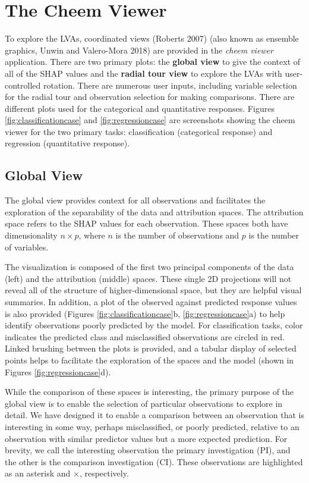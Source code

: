 \documentclass[
]{article}
\begin{document}
\hypertarget{sec:cheemviewer}{%
\section{The Cheem Viewer}\label{sec:cheemviewer}}

To explore the LVAs, coordinated views (Roberts 2007) (also known as ensemble graphics, Unwin and Valero-Mora 2018) are provided in the \emph{cheem viewer} application. There are two primary plots: the \textbf{global view} to give the context of all of the SHAP values and the \textbf{radial tour view} to explore the LVAs with user-controlled rotation. There are numerous user inputs, including variable selection for the radial tour and observation selection for making comparisons. There are different plots used for the categorical and quantitative responses. Figures \ref{fig:classificationcase} and \ref{fig:regressioncase} are screenshots showing the cheem viewer for the two primary tasks: classification (categorical response) and regression (quantitative response).

\hypertarget{global-view}{%
\subsection{Global View}\label{global-view}}

The global view provides context for all observations and facilitates the exploration of the separability of the data and attribution spaces. The attribution space refers to the SHAP values for each observation. These spaces both have dimensionality \(n \times p\), where \(n\) is the number of observations and \(p\) is the number of variables.

The visualization is composed of the first two principal components of the data (left) and the attribution (middle) spaces. These single 2D projections will not reveal all of the structure of higher-dimensional space, but they are helpful visual summaries. In addition, a plot of the observed against predicted response values is also provided (Figures \ref{fig:classificationcase}b, \ref{fig:regressioncase}a) to help identify observations poorly predicted by the model. For classification tasks, color indicates the predicted class and misclassified observations are circled in red. Linked brushing between the plots is provided, and a tabular display of selected points helps to facilitate the exploration of the spaces and the model (shown in Figures \ref{fig:regressioncase}d).

While the comparison of these spaces is interesting, the primary purpose of the global view is to enable the selection of particular observations to explore in detail. We have designed it to enable a comparison between an observation that is interesting in some way, perhaps misclassified, or poorly predicted, relative to an observation with similar predictor values but a more expected prediction. For brevity, we call the interesting observation the primary investigation (PI), and the other is the comparison investigation (CI). These observations are highlighted as an asterisk and \(\times\), respectively.
\end{document}
